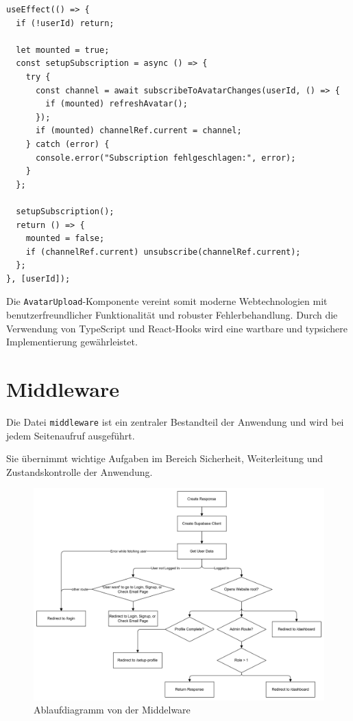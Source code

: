 \begin{inhalt}
\begin{lstlisting}[style=mytsx, label={lst:avatar_subscription}]
useEffect(() => {
  if (!userId) return;
  
  let mounted = true;
  const setupSubscription = async () => {
    try {
      const channel = await subscribeToAvatarChanges(userId, () => {
        if (mounted) refreshAvatar();
      });
      if (mounted) channelRef.current = channel;
    } catch (error) {
      console.error("Subscription fehlgeschlagen:", error);
    }
  };

  setupSubscription();
  return () => {
    mounted = false;
    if (channelRef.current) unsubscribe(channelRef.current);
  };
}, [userId]);
\end{lstlisting}

Die \texttt{AvatarUpload}-Komponente vereint somit moderne Webtechnologien mit benutzerfreundlicher Funktionalität und robuster Fehlerbehandlung. Durch die Verwendung von TypeScript und React-Hooks wird eine wartbare und typsichere Implementierung gewährleistet.







\newpage

\section{Middleware}
\label{ref:middelware}

Die Datei \texttt{middleware} ist ein zentraler Bestandteil der Anwendung und wird bei jedem Seitenaufruf ausgeführt.  
\vspace{0.15cm}

Sie übernimmt wichtige Aufgaben im Bereich Sicherheit, Weiterleitung und Zustandskontrolle der Anwendung.  

\vspace{2cm}

\begin{figure}[!htb]
\centering
\includegraphics[width=1\textwidth]{files/Thomas/pics/Website/middelware/middelware.png}
\caption[Ablaufdiagramm von der Middelware]{Ablaufdiagramm von der Middelware}
\label{fig:middleware}
\end{figure}


\end{inhalt}
